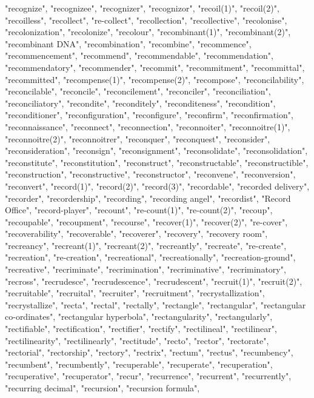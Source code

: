 "recognize",
"recognizee",
"recognizer",
"recognizor",
"recoil(1)",
"recoil(2)",
"recoilless",
"recollect",
"re-collect",
"recollection",
"recollective",
"recolonise",
"recolonization",
"recolonize",
"recolour",
"recombinant(1)",
"recombinant(2)",
"recombinant DNA",
"recombination",
"recombine",
"recommence",
"recommencement",
"recommend",
"recommendable",
"recommendation",
"recommendatory",
"recommender",
"recommit",
"recommitment",
"recommittal",
"recommitted",
"recompense(1)",
"recompense(2)",
"recompose",
"reconcilability",
"reconcilable",
"reconcile",
"reconcilement",
"reconciler",
"reconciliation",
"reconciliatory",
"recondite",
"reconditely",
"reconditeness",
"recondition",
"reconditioner",
"reconfiguration",
"reconfigure",
"reconfirm",
"reconfirmation",
"reconnaissance",
"reconnect",
"reconnection",
"reconnoiter",
"reconnoitre(1)",
"reconnoitre(2)",
"reconnoitrer",
"reconquer",
"reconquest",
"reconsider",
"reconsideration",
"reconsign",
"reconsignment",
"reconsolidate",
"reconsolidation",
"reconstitute",
"reconstitution",
"reconstruct",
"reconstructable",
"reconstructible",
"reconstruction",
"reconstructive",
"reconstructor",
"reconvene",
"reconversion",
"reconvert",
"record(1)",
"record(2)",
"record(3)",
"recordable",
"recorded delivery",
"recorder",
"recordership",
"recording",
"recording angel",
"recordist",
"Record Office",
"record-player",
"recount",
"re-count(1)",
"re-count(2)",
"recoup",
"recoupable",
"recoupment",
"recourse",
"recover(1)",
"recover(2)",
"re-cover",
"recoverability",
"recoverable",
"recoverer",
"recovery",
"recovery room",
"recreancy",
"recreant(1)",
"recreant(2)",
"recreantly",
"recreate",
"re-create",
"recreation",
"re-creation",
"recreational",
"recreationally",
"recreation-ground",
"recreative",
"recriminate",
"recrimination",
"recriminative",
"recriminatory",
"recross",
"recrudesce",
"recrudescence",
"recrudescent",
"recruit(1)",
"recruit(2)",
"recruitable",
"recruital",
"recruiter",
"recruitment",
"recrystallization",
"recrystallize",
"recta",
"rectal",
"rectally",
"rectangle",
"rectangular",
"rectangular co-ordinates",
"rectangular hyperbola",
"rectangularity",
"rectangularly",
"rectifiable",
"rectification",
"rectifier",
"rectify",
"rectilineal",
"rectilinear",
"rectilinearity",
"rectilinearly",
"rectitude",
"recto",
"rector",
"rectorate",
"rectorial",
"rectorship",
"rectory",
"rectrix",
"rectum",
"rectus",
"recumbency",
"recumbent",
"recumbently",
"recuperable",
"recuperate",
"recuperation",
"recuperative",
"recuperator",
"recur",
"recurrence",
"recurrent",
"recurrently",
"recurring decimal",
"recursion",
"recursion formula",
